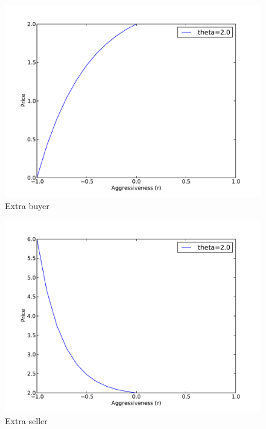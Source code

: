 \documentclass[preprint]{acm_proc_article-sp} %
\begin{document}
\begin{figure} 
\centering
\includegraphics[width=\columnwidth]{graphs_and_stats/graph_extra_buyer.pdf}
\caption{Extra buyer}
\end{figure}

\begin{figure} 
\centering
\includegraphics[width=\columnwidth]{graphs_and_stats/graph_extra_seller.pdf}
\caption{Extra seller}
\end{figure}
\end{document}
